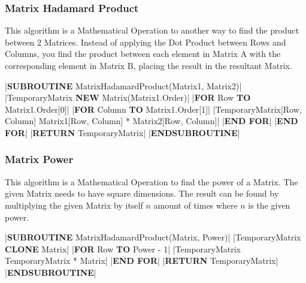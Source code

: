 \begin{flushleft}
                \vspace{0.5cm}
            \subsubsection{Matrix Hadamard Product}
                This algorithm is a Mathematical Operation to another way to find the product between 2 Matrices. Instead of
                applying the Dot Product between Rows and Columns, you find the product between each element in Matrix A
                with the corresponding element in Matrix B, placing the result in the resultant Matrix.

                \vspace{0.2cm}
                \begin{pseudocode}
|\textbf{SUBROUTINE} MatrixHadamardProduct(Matrix1, Matrix2)|
    |TemporaryMatrix \leftarrow \textbf{NEW} Matrix(Matrix1.Order)|
    |\textbf{FOR} Row  \textbf{TO} Matrix1.Order[0]|
        |\textbf{FOR} Column  \textbf{TO} Matrix1.Order[1]|
            |TemporaryMatrix[Row, Column] \leftarrow Matrix1[Row, Column] * Matrix2[Row, Column]|
        |\textbf{END FOR}|
    |\textbf{END FOR}|
    |\textbf{RETURN} TemporaryMatrix|
|\textbf{ENDSUBROUTINE}|
                \end{pseudocode}   

                \vspace{0.5cm}
            \subsubsection{Matrix Power}
                This algorithm is a Mathematical Operation to find the power of a Matrix. The given Matrix needs to have square dimensions.
                The result can be found by multiplying the given Matrix by itself $n$ amount of times where $n$ is the given power.
                
                \vspace{0.2cm}
                \begin{pseudocode}
|\textbf{SUBROUTINE} MatrixHadamardProduct(Matrix, Power)|
    |TemporaryMatrix \leftarrow \textbf{CLONE} Matrix|
    |\textbf{FOR} Row  \textbf{TO} Power - 1|
        |TemporaryMatrix \leftarrow TemporaryMatrix * Matrix|
    |\textbf{END FOR}|
    |\textbf{RETURN} TemporaryMatrix|
|\textbf{ENDSUBROUTINE}|
                \end{pseudocode}  

                \vspace{0.5cm}

\end{flushleft}
